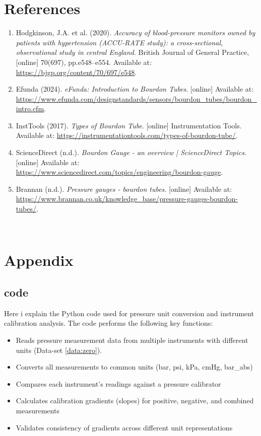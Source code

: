 \documentclass{article}
\begin{document}
	
	\newpage
	\section{References}	
	\begin{enumerate}
		\item Hodgkinson, J.A. et al. (2020). \textit{Accuracy of blood-pressure monitors owned by patients with hypertension (ACCU-RATE study): a cross-sectional, observational study in central England}. British Journal of General Practice, [online] 70(697), pp.e548–e554. Available at: \url{https://bjgp.org/content/70/697/e548}.
		\item Efunda (2024). \textit{eFunda: Introduction to Bourdon Tubes}. [online] Available at: \url{https://www.efunda.com/designstandards/sensors/bourdon_tubes/bourdon_intro.cfm}.
		\item InstTools (2017). \textit{Types of Bourdon Tube}. [online] Instrumentation Tools. Available at: \url{https://instrumentationtools.com/types-of-bourdon-tube/}.
		\item ScienceDirect (n.d.). \textit{Bourdon Gauge - an overview | ScienceDirect Topics}. [online] Available at: \url{https://www.sciencedirect.com/topics/engineering/bourdon-gauge}.
		‌\item Brannan (n.d.). \textit{Pressure gauges - bourdon tubes}. [online] Available at: \url{https://www.brannan.co.uk/knowledge_base/pressure-gauges-bourdon-tubes/}.
	\end{enumerate}
	‌	
	\newpage
	
\section{Appendix}
\renewcommand{\thesubsection}{\Alph{subsection}}

\subsection{code}\label{subsec:code}\small
Here i explain the Python code used for pressure unit conversion and instrument calibration analysis. The code performs the following key functions:
\begin{itemize}[itemsep=-1mm]
	\item Reads pressure measurement data from multiple instruments with different units (Data-set \ref{data:zero}).
	\item Converts all measurements to common units (bar, psi, kPa, cmHg, bar\_abs)
	\item Compares each instrument's readings against a pressure calibrator
	\item Calculates calibration gradients (slopes) for positive, negative, and combined measurements
	\item Validates consistency of gradients across different unit representations
\end{itemize}
\vspace{-1.4em}
\end{document}
